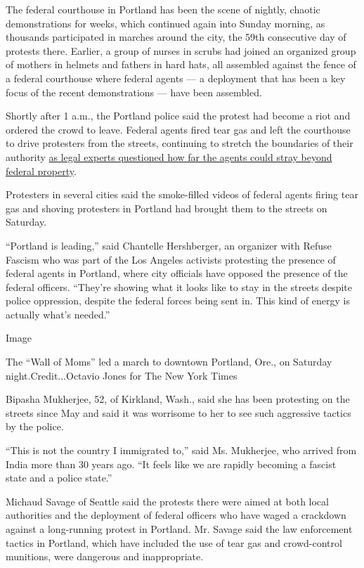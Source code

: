 The federal courthouse in Portland has been the scene of nightly,
chaotic demonstrations for weeks, which continued again into Sunday
morning, as thousands participated in marches around the city, the 59th
consecutive day of protests there. Earlier, a group of nurses in scrubs
had joined an organized group of mothers in helmets and fathers in hard
hats, all assembled against the fence of a federal courthouse where
federal agents --- a deployment that has been a key focus of the recent
demonstrations --- have been assembled.

Shortly after 1 a.m., the Portland police said the protest had become a
riot and ordered the crowd to leave. Federal agents fired tear gas and
left the courthouse to drive protesters from the streets, continuing to
stretch the boundaries of their authority
\href{https://www.nytimes.com/2020/07/25/us/portland-federal-legal-jurisdiction-courts.html}{as
legal experts questioned how far the agents could stray beyond federal
property}.

Protesters in several cities said the smoke-filled videos of federal
agents firing tear gas and shoving protesters in Portland had brought
them to the streets on Saturday.

``Portland is leading,'' said Chantelle Hershberger, an organizer with
Refuse Fascism who was part of the Los Angeles activists protesting the
presence of federal agents in Portland, where city officials have
opposed the presence of the federal officers. ``They're showing what it
looks like to stay in the streets despite police oppression, despite the
federal forces being sent in. This kind of energy is actually what's
needed.''

Image

The ``Wall of Moms'' led a march to downtown Portland, Ore., on Saturday
night.Credit...Octavio Jones for The New York Times

Bipasha Mukherjee, 52, of Kirkland, Wash., said she has been protesting
on the streets since May and said it was worrisome to her to see such
aggressive tactics by the police.

``This is not the country I immigrated to,'' said Ms. Mukherjee, who
arrived from India more than 30 years ago. ``It feels like we are
rapidly becoming a fascist state and a police state.''

Michaud Savage of Seattle said the protests there were aimed at both
local authorities and the deployment of federal officers who have waged
a crackdown against a long-running protest in Portland. Mr. Savage said
the law enforcement tactics in Portland, which have included the use of
tear gas and crowd-control munitions, were dangerous and inappropriate.

